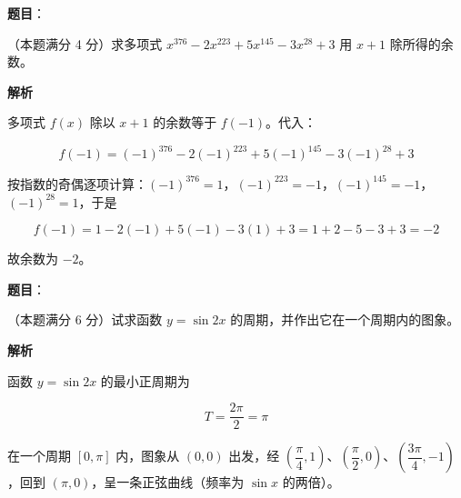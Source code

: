 


\begin{answer}

\textbf{题目}：

（本题满分 4 分）求多项式 $x^{376}-2x^{223}+5x^{145}-3x^{28}+3$ 用 $x+1$ 除所得的余数。

\textbf{解析}

多项式 $f(x)$ 除以 $x+1$ 的余数等于 $f(-1)$。代入：

\nopagebreak[4]
\[
f(-1)=(-1)^{376}-2(-1)^{223}+5(-1)^{145}-3(-1)^{28}+3
\]

按指数的奇偶逐项计算：$(-1)^{376}=1$，$(-1)^{223}=-1$，$(-1)^{145}=-1$，$(-1)^{28}=1$，于是

\nopagebreak[4]
\[
f(-1)=1-2(-1)+5(-1)-3(1)+3
=1+2-5-3+3=-2
\]

故余数为 $-2$。


\end{answer}
\begin{answer}

\textbf{题目}：

（本题满分 6 分）试求函数 $y=\sin 2x$ 的周期，并作出它在一个周期内的图象。

\textbf{解析}

函数 $y=\sin 2x$ 的最小正周期为

\nopagebreak[4]
\[
T=\frac{2\pi}{2}=\pi
\]

在一个周期 $[0,\pi]$ 内，图象从 $(0,0)$ 出发，经 $\left(\dfrac\pi4,1\right)$、$\left(\dfrac\pi2,0\right)$、$\left(\dfrac{3\pi}{4},-1\right)$，回到 $(\pi,0)$，呈一条正弦曲线（频率为 $\sin x$ 的两倍）。


\end{answer}
